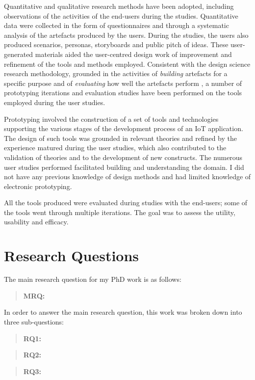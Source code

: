 Quantitative and qualitative research methods \autocite{robson_real_1993} have been adopted, including observations of the activities of the end-users during the studies. Quantitative data were collected in the form of questionnaires and through a systematic analysis of the artefacts produced by the users. During the studies, the users also produced scenarios, personas, storyboards and public pitch of ideas. These user-generated materials aided the user-centred design work of improvement and refinement of the tools and methods employed. Consistent with the design science research methodology, grounded in the activities of \emph{building} artefacts for a specific purpose and of \emph{evaluating} how well the artefacts perform \autocite{march_design_1995}, a number of prototyping iterations and evaluation studies have been performed on the tools employed during the user studies.

Prototyping involved the construction of a set of tools and technologies supporting the various stages of the development process of an IoT application. The design of such tools was grounded in relevant theories and refined by the experience matured during the user studies, which also contributed to the validation of theories and to the development of new constructs. The numerous user studies performed facilitated building and understanding the domain. I did not have any previous knowledge of design methods and had limited knowledge of electronic prototyping.

All the tools produced were evaluated during studies with the end-users; some of the tools went through multiple iterations. The goal was to assess the utility, usability and efficacy.


\section{Research Questions}
\label{sec:research-questions}

The main research question for my PhD work is as follows:
\begin{quote}
	\textbf{MRQ:} \MRQ 
\end{quote}

In order to answer the main research question, this work was broken down into three sub-questions:
\begin{quote}
	\textbf{RQ1:} \RQi 
\end{quote}
\begin{quote}
	\textbf{RQ2:} \RQii 
\end{quote}
\begin{quote}
	\textbf{RQ3:} \RQiii
\end{quote}


